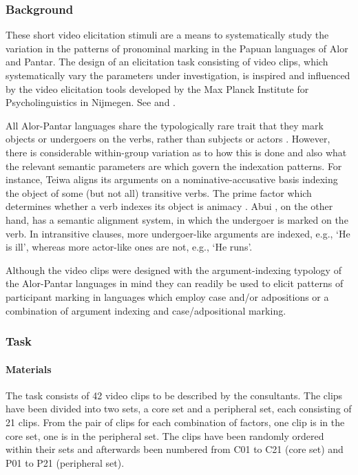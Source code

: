 \subsubsection{Background}

These short video elicitation stimuli are a means to systematically study the variation in the patterns of pronominal marking in the Papuan languages of Alor and Pantar. The design of an elicitation task consisting of video clips, which systematically vary the parameters under investigation, is inspired and influenced by the video elicitation tools developed by the Max Planck Institute for Psycholinguistics in Nijmegen. See \citet{BohnemeyerEtAl2001,BowermanEtAl2004} and \citet{EvansEtAl2004}.

All Alor-Pantar languages share the typologically rare trait that they mark objects or undergoers on the verbs, rather than subjects or actors \citep{Siewierska2013}. However, there is considerable within-group variation as to how this is done and also what the relevant semantic parameters are which govern the indexation patterns. For instance, Teiwa \citep{Klamer2010} aligns its arguments on a nominative-accusative basis indexing the object of some (but not all) transitive verbs. The prime factor which determines whether a verb indexes its object is animacy \citep{KlamerEtAl2006,Klamer2010}. Abui \citep{Kratochvil2007,Kratochvil2011}, on the other hand, has a semantic alignment system, in which the undergoer is marked on the verb. In intransitive clauses, more undergoer-like arguments are indexed, e.g., `He is ill', whereas more actor-like ones are not, e.g., `He runs'. 

  Although the video clips were designed with the argument-indexing typology of the Alor-Pantar languages in mind they can readily be used to elicit patterns of participant marking in languages which employ case and/or adpositions or a combination of argument indexing and case/adpositional marking. 

\subsubsection{Task}

\paragraph{Materials}

The task consists of 42 video clips to be described by the consultants. The clips have been divided into two sets, a core set and a peripheral set, each consisting of 21 clips. From the pair of clips for each combination of factors, one clip is in the core set, one is in the peripheral set. The clips have been randomly ordered within their sets and afterwards been numbered from C01 to C21 (core set) and P01 to P21 (peripheral set). 

